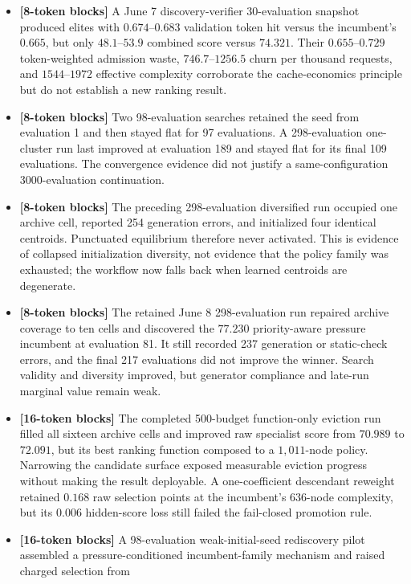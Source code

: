 \documentclass[11pt]{article}
\newcommand{\blocktag}[1]{\textbf{\color{navy}[#1-token blocks]}}
\begin{document}
\begin{itemize}
  \item \blocktag{8} A June 7 discovery-verifier 30-evaluation snapshot produced elites with
  \(0.674\)--\(0.683\) validation token hit versus the incumbent's \(0.665\), but only
  \(48.1\)--\(53.9\) combined score versus \(74.321\).  Their
  \(0.655\)--\(0.729\) token-weighted admission waste, \(746.7\)--\(1256.5\) churn per
  thousand requests, and \(1544\)--\(1972\) effective complexity corroborate the
  cache-economics principle but do not establish a new ranking result.
  \item \blocktag{8} Two 98-evaluation searches retained the seed from evaluation 1 and then stayed
  flat for 97 evaluations.  A 298-evaluation one-cluster run last improved at
  evaluation 189 and stayed flat for its final 109 evaluations.  The convergence
  evidence did not justify a same-configuration 3000-evaluation continuation.
  \item \blocktag{8} The preceding 298-evaluation diversified run occupied one archive cell, reported
  254 generation errors, and initialized four identical centroids.  Punctuated
  equilibrium therefore never activated.  This is evidence of collapsed initialization
  diversity, not evidence that the policy family was exhausted; the workflow now
  falls back when learned centroids are degenerate.
  \item \blocktag{8} The retained June 8 298-evaluation run repaired archive coverage to ten cells and
  discovered the \(77.230\) priority-aware pressure incumbent at evaluation 81.  It
  still recorded 237 generation or static-check errors, and the final 217 evaluations
  did not improve the winner.  Search validity and diversity improved, but generator
  compliance and late-run marginal value remain weak.
  \item \blocktag{16} The completed 500-budget function-only eviction run filled all sixteen archive
  cells and improved raw specialist score from \(70.989\) to \(72.091\), but its best
  ranking function composed to a \(1{,}011\)-node policy.  Narrowing the candidate
  surface exposed measurable eviction progress without making the result deployable.
  A one-coefficient descendant reweight retained \(0.168\) raw selection points at the
  incumbent's 636-node complexity, but its \(0.006\) hidden-score loss still failed the
  fail-closed promotion rule.
  \item \blocktag{16} A 98-evaluation weak-initial-seed rediscovery pilot assembled a
  pressure-conditioned incumbent-family mechanism and raised charged selection from

\end{itemize}
\end{document}
